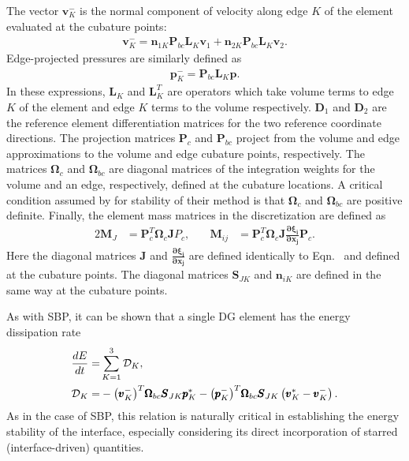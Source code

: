 The vector $\pmb{v}_{K}^{-}$ is the normal component of velocity along
edge $K$ of the element evaluated at the cubature points:
\begin{align}
  \pmb{v}^{-}_{K} = \pmb{n}_{1K} \pmb{P}_{bc} \pmb{L}_{K} \pmb{v}_{1}
  + \pmb{n}_{2K} \pmb{P}_{bc} \pmb{L}_{K} \pmb{v}_{2}.
\end{align}
Edge-projected pressures are similarly defined as
\begin{align}
  \pmb{p}_{K}^{-} = \pmb{P}_{bc}\pmb{L}_{K} \pmb{p}.
\end{align}
In these expressions, $\pmb{L}_{K}$ and $\pmb{L}_{K}^{T}$ are operators
which take volume terms to edge $K$ of the element and edge $K$ terms to
the volume respectively. $\pmb{D}_{1}$ and $\pmb{D}_{2}$ are the reference
element differentiation matrices for the two reference coordinate directions.
The projection matrices $\pmb{P}_{c}$ and $\pmb{P}_{bc}$ project from the volume and edge
approximations to the volume and edge cubature points, respectively. The matrices
$\pmb{\Omega}_{c}$ and $\pmb{\Omega}_{bc}$ are diagonal matrices of the integration weights for
the volume and an edge, respectively, defined at the cubature locations. A critical
condition assumed by \cite{kozdon2016stable} for stability of their method is that
$\pmb{\Omega}_{c}$ and $\pmb{\Omega}_{bc}$ are positive definite. Finally, the
element mass matrices in the discretization are defined as
\begin{alignat}{2}
  \pmb{M}_{J}  &= \pmb{P}_{c}^{T} \pmb{\Omega}_{c} \pmb{J} P_{c},\quad&
  \pmb{M}_{ij} &= \pmb{P}_{c}^{T} \pmb{\Omega}_{c} \pmb{J}
		  \frac{\pmb{\partial \xi_{i}}}{\pmb{\partial x_{j}}} \pmb{P}_{c}.
\end{alignat}
Here the diagonal matrices $\pmb{J}$ and $\pmb{\frac{\partial \xi_{i}}{\partial x_{j}}}$
are defined identically to Eqn.~ and defined at the cubature points.
The diagonal matrices $\pmb{S}_{JK}$ and $\pmb{n}_{iK}$ are defined in the same way at the cubature
points.

As with SBP, it can be shown that a single DG element has
the energy dissipation rate
\begin{align}
  \frac{dE}{dt} = & \sum_{K=1}^{3} \mathcal{D}_{K},\\
  \mathcal{D}_{K} = &
  - {\left(\pmb{v}_{K}^{-}\right)}^{T}\pmb{\Omega}_{bc}\pmb{S}_{JK}\pmb{p}_{K}^{*}
  - {\left(\pmb{p}_{K}^{-}\right)}^{T}\pmb{\Omega}_{bc}\pmb{S}_{JK}
  \left(\pmb{v}^{*}_{K} - \pmb{v}^{-}_{K}\right). \label{eq:dg_diss}
\end{align}
As in the case of SBP, this relation is naturally critical in establishing the
energy stability of the interface, especially considering its direct incorporation
of starred (interface-driven) quantities.

